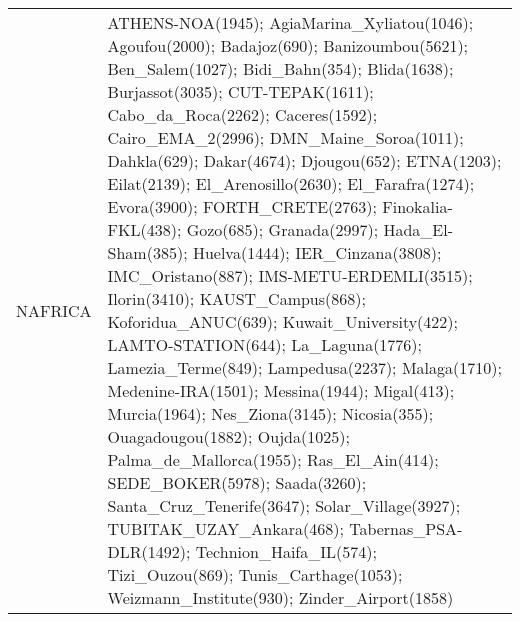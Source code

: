 \documentclass[journal abbreviation, manuscript]{copernicus}
\begin{document}
\begin{table}
\begin{tabularx}{\textwidth}{lX}
   NAFRICA &                                                                                                                                                                                                                                                                                                                                                                                                                                                                                                                                                                                                                                                                                                                                                                                                                                                                                                                                                                                                                                                                                                            ATHENS-NOA(1945); AgiaMarina\_Xyliatou(1046); Agoufou(2000); Badajoz(690); Banizoumbou(5621); Ben\_Salem(1027); Bidi\_Bahn(354); Blida(1638); Burjassot(3035); CUT-TEPAK(1611); Cabo\_da\_Roca(2262); Caceres(1592); Cairo\_EMA\_2(2996); DMN\_Maine\_Soroa(1011); Dahkla(629); Dakar(4674); Djougou(652); ETNA(1203); Eilat(2139); El\_Arenosillo(2630); El\_Farafra(1274); Evora(3900); FORTH\_CRETE(2763); Finokalia-FKL(438); Gozo(685); Granada(2997); Hada\_El-Sham(385); Huelva(1444); IER\_Cinzana(3808); IMC\_Oristano(887); IMS-METU-ERDEMLI(3515); Ilorin(3410); KAUST\_Campus(868); Koforidua\_ANUC(639); Kuwait\_University(422); LAMTO-STATION(644); La\_Laguna(1776); Lamezia\_Terme(849); Lampedusa(2237); Malaga(1710); Medenine-IRA(1501); Messina(1944); Migal(413); Murcia(1964); Nes\_Ziona(3145); Nicosia(355); Ouagadougou(1882); Oujda(1025); Palma\_de\_Mallorca(1955); Ras\_El\_Ain(414); SEDE\_BOKER(5978); Saada(3260); Santa\_Cruz\_Tenerife(3647); Solar\_Village(3927); TUBITAK\_UZAY\_Ankara(468); Tabernas\_PSA-DLR(1492); Technion\_Haifa\_IL(574); Tizi\_Ouzou(869); Tunis\_Carthage(1053); Weizmann\_Institute(930); Zinder\_Airport(1858) \\

\end{tabularx}
\end{table}
\end{document}
